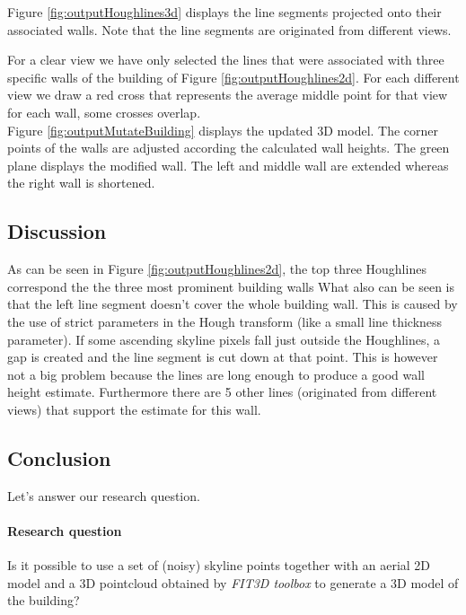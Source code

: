 Figure \ref{fig:outputHoughlines3d} 
 displays the line segments projected onto their associated walls.
Note that the line segments are originated from different views. 
 
For a clear view we have only selected the lines that were associated with three
specific walls of the building of Figure \ref{fig:outputHoughlines2d}.  
For each different view we draw a red cross that represents the average middle
point for that view for each wall, some crosses overlap.\\

Figure \ref{fig:outputMutateBuilding} 
displays the updated 3D model. The
corner points of the walls are adjusted according the calculated wall heights.
The green plane displays the modified wall. The left and middle wall are extended
whereas the right wall is shortened.\\


\subsection{Discussion}
As can be seen in Figure \ref{fig:outputHoughlines2d}, 
the top three Houghlines correspond the the three most prominent building walls
What also can be seen is that the left line segment doesn't cover the whole
building wall. This is caused by the use of strict parameters in the Hough transform
(like a small line thickness parameter).  If some ascending skyline pixels fall just outside
the Houghlines, a gap is created and the line segment is cut down at that point.
This is however not a big problem because the lines are long enough to produce a
good wall height estimate. Furthermore there are 5 other lines
(originated from different views) that support the estimate for this wall.





\subsection{Conclusion}
Let's answer our research question.
\paragraph{Research question}
Is it possible to use a set of (noisy) skyline points together with an aerial
2D model and a 3D pointcloud obtained by \emph{FIT3D toolbox\cite{fit3d}} to generate a 3D model of the building?

